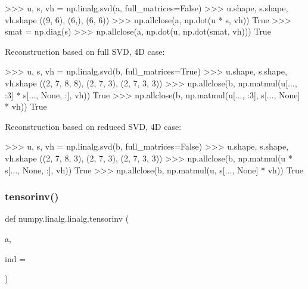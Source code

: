 \begin{DoxyVerb}
>>> u, s, vh = np.linalg.svd(a, full_matrices=False)
>>> u.shape, s.shape, vh.shape
((9, 6), (6,), (6, 6))
>>> np.allclose(a, np.dot(u * s, vh))
True
>>> smat = np.diag(s)
>>> np.allclose(a, np.dot(u, np.dot(smat, vh)))
True

Reconstruction based on full SVD, 4D case:

>>> u, s, vh = np.linalg.svd(b, full_matrices=True)
>>> u.shape, s.shape, vh.shape
((2, 7, 8, 8), (2, 7, 3), (2, 7, 3, 3))
>>> np.allclose(b, np.matmul(u[..., :3] * s[..., None, :], vh))
True
>>> np.allclose(b, np.matmul(u[..., :3], s[..., None] * vh))
True

Reconstruction based on reduced SVD, 4D case:

>>> u, s, vh = np.linalg.svd(b, full_matrices=False)
>>> u.shape, s.shape, vh.shape
((2, 7, 8, 3), (2, 7, 3), (2, 7, 3, 3))
>>> np.allclose(b, np.matmul(u * s[..., None, :], vh))
True
>>> np.allclose(b, np.matmul(u, s[..., None] * vh))
True\end{DoxyVerb}
 \mbox{\label{namespacenumpy_1_1linalg_1_1linalg_a150458818a0bf755f6400348ba27e21c}} 
\subsubsection{\texorpdfstring{tensorinv()}{tensorinv()}}
{\footnotesize\ttfamily def numpy.\+linalg.\+linalg.\+tensorinv (\begin{DoxyParamCaption}\item[{}]{a,  }\item[{}]{ind = {} }\end{DoxyParamCaption})}

